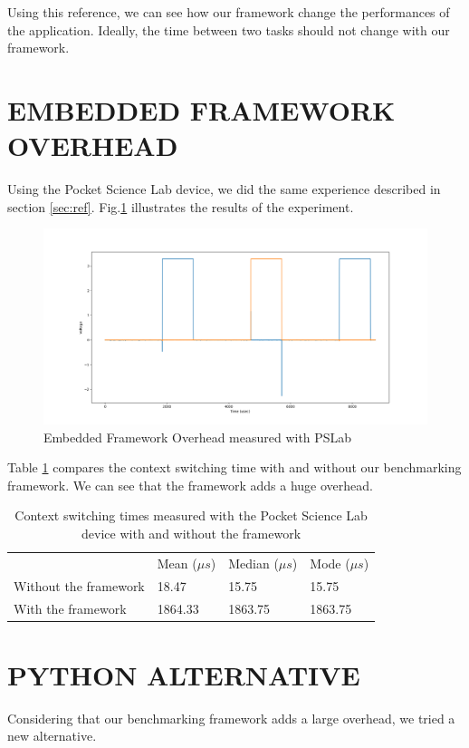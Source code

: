 \documentclass[a4paper, 10pt, conference]{ieeeconf}      %
\begin{document}
Using this reference, we can see how our framework change the performances of the application.
Ideally, the time between two tasks should not change with our framework.

\section{EMBEDDED FRAMEWORK OVERHEAD}

Using the Pocket Science Lab device, we did the same experience described in section \ref{sec:ref}.
Fig.\ref{fig:framework_overhead} illustrates the results of the experiment.

\begin{figure}[!h]
    \centering
    \includegraphics[scale=0.2]{framework_overhead.png}
    \caption{Embedded Framework Overhead measured with PSLab}
    \label{fig:framework_overhead}
\end{figure}

Table \ref{table:context_switching_times} compares the context switching time with and without our benchmarking framework.
We can see that the framework adds a huge overhead.


\begin{table}[!h]
    \centering
    \caption{Context switching times measured with the Pocket Science Lab device with and without the framework}
    \begin{tabular}{llll}
        \cline{2-4}
        & Mean ($\mu s$) & Median ($\mu s$) & Mode ($\mu s$) \\ \cline{2-4}
        Without the framework & 18.47 & 15.75 & 15.75 \\
        With the framework & 1864.33 & 1863.75 & 1863.75
    \end{tabular}
    \label{table:context_switching_times}
\end{table}

\section{PYTHON ALTERNATIVE}
Considering that our benchmarking framework adds a large overhead, we tried a new alternative.
\end{document}
